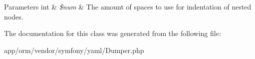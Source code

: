 \begin{DoxyParams}[1]{Parameters}
int & {\em \$num} & The amount of spaces to use for indentation of nested nodes. \\
\hline
\end{DoxyParams}


The documentation for this class was generated from the following file\+:\begin{DoxyCompactItemize}
\item 
app/orm/vendor/symfony/yaml/Dumper.\+php\end{DoxyCompactItemize}
